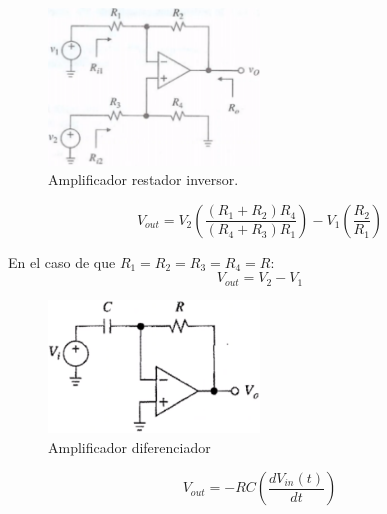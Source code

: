 \documentclass[12pt, letterpaper]{extarticle}
\begin{document}
% 






\begin{figure}[h]
    \centering
    \includegraphics[width=0.5\textwidth]{Media/amplificador_restador_inverso.png}
    \caption{Amplificador restador inversor.}
    \label{Fig: Amplificador restador inversor}
\end{figure}

\begin{equation*}
    V_{out} = V_{2}\left(\frac{(R_{1}+R_{2})R_{4}}{(R_{4}+R_{3})R_{1}}\right)
             -V_{1}\left(\frac{R_{2}}{R_{1}}\right)
\end{equation*}

En el caso de que $R_{1}=R_{2}=R_{3}=R_{4}=R$:
\begin{equation*}
    V_{out} = V_{2} - V_{1}
\end{equation*}


\begin{figure}[h]
    \centering
    \includegraphics[width=0.5\textwidth]{Media/amplificador_diferenciador.png}
    \caption{Amplificador diferenciador}
    \label{Fig: Amplificador diferenciador}
\end{figure}

\begin{equation*}
    V_{out} = -RC\left(\frac{dV_{in}(t)}{dt}\right)
\end{equation*}

\end{document}
